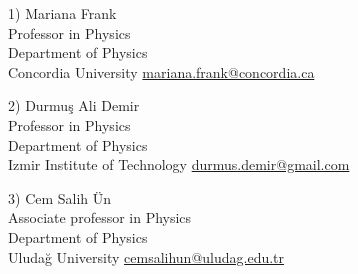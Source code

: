 \documentclass[]{friggeri-cv}
\begin{document}
	\begin{entrylist}
		
		\entry
		{1)}
		{Mariana Frank \\ \normalfont
			Professor in Physics \\
			Department of Physics \\
			Concordia University}
		{\href{mariana.frank@concordia.ca}{mariana.frank@concordia.ca}} 
		
		
		\entry
		{2)}
		{Durmuş Ali Demir \\ \normalfont
			Professor in Physics \\
			Department of Physics \\
			Izmir Institute of Technology}
		{\href{durmus.demir@gmail.com}{durmus.demir@gmail.com}} 
		
		
		\entry
		{3)}
		{Cem Salih Ün  \\ \normalfont
		Associate professor in Physics \\
		Department of Physics \\
		Uludağ University}
		{\href{cemsalihun@uludag.edu.tr}{cemsalihun@uludag.edu.tr}} 
		
		
	\end{entrylist}
\end{document}
